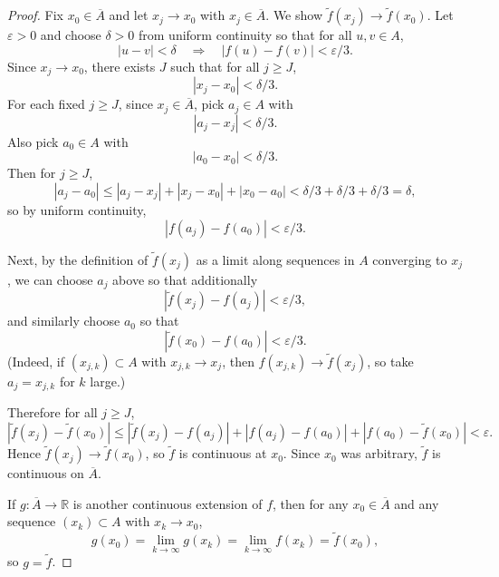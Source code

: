 \documentclass[12pt]{article}
\renewcommand{\(}{\left(}%
\renewcommand{\)}{\right)}%
\renewcommand{\[}{\left[}%
\renewcommand{\]}{\right]}%
\newtheorem{proof}{Proof.}}
\begin{document}
\begin{proof}
Fix $x_0\in \overline{A}$ and let $x_j\to x_0$ with $x_j\in \overline{A}$.
We show $\tilde f(x_j)\to \tilde f(x_0)$.
Let $\varepsilon>0$ and choose $\delta>0$ from uniform continuity so that for all $u,v\in A$,
\begin{equation*}
|u-v|<\delta \quad \Rightarrow \quad |f(u)-f(v)|<\varepsilon/3.
\end{equation*}
Since $x_j\to x_0$, there exists $J$ such that for all $j\ge J$,
\begin{equation*}
|x_j-x_0|<\delta/3.
\end{equation*}
For each fixed $j\ge J$, since $x_j\in\overline{A}$, pick $a_j\in A$ with
\begin{equation*}
|a_j-x_j|<\delta/3.
\end{equation*}
Also pick $a_0\in A$ with
\begin{equation*}
|a_0-x_0|<\delta/3.
\end{equation*}
Then for $j\ge J$,
\begin{equation*}
|a_j-a_0|
\le |a_j-x_j|+|x_j-x_0|+|x_0-a_0|
< \delta/3+\delta/3+\delta/3=\delta,
\end{equation*}
so by uniform continuity,
\begin{equation*}
|f(a_j)-f(a_0)|<\varepsilon/3.
\end{equation*}

Next, by the definition of $\tilde f(x_j)$ as a limit along sequences in $A$ converging to $x_j$, we can choose $a_j$ above
so that additionally
\begin{equation*}
|\tilde f(x_j)-f(a_j)|<\varepsilon/3,
\end{equation*}
and similarly choose $a_0$ so that
\begin{equation*}
|\tilde f(x_0)-f(a_0)|<\varepsilon/3.
\end{equation*}
(Indeed, if $(x_{j,k})\subset A$ with $x_{j,k}\to x_j$, then $f(x_{j,k})\to \tilde f(x_j)$, so take $a_j=x_{j,k}$ for $k$ large.)

Therefore for all $j\ge J$,
\begin{equation*}
|\tilde f(x_j)-\tilde f(x_0)|
\le |\tilde f(x_j)-f(a_j)|+|f(a_j)-f(a_0)|+|f(a_0)-\tilde f(x_0)|
< \varepsilon.
\end{equation*}
Hence $\tilde f(x_j)\to \tilde f(x_0)$, so $\tilde f$ is continuous at $x_0$. Since $x_0$ was arbitrary, $\tilde f$ is continuous
on $\overline{A}$.

If $g:\overline{A}\to\mathbb{R}$ is another continuous extension of $f$, then for any $x_0\in\overline{A}$ and any sequence
$(x_k)\subset A$ with $x_k\to x_0$,
\begin{equation*}
g(x_0)=\lim_{k\to\infty} g(x_k)=\lim_{k\to\infty} f(x_k)=\tilde f(x_0),
\end{equation*}
so $g=\tilde f$.


\end{proof}
\end{document}

